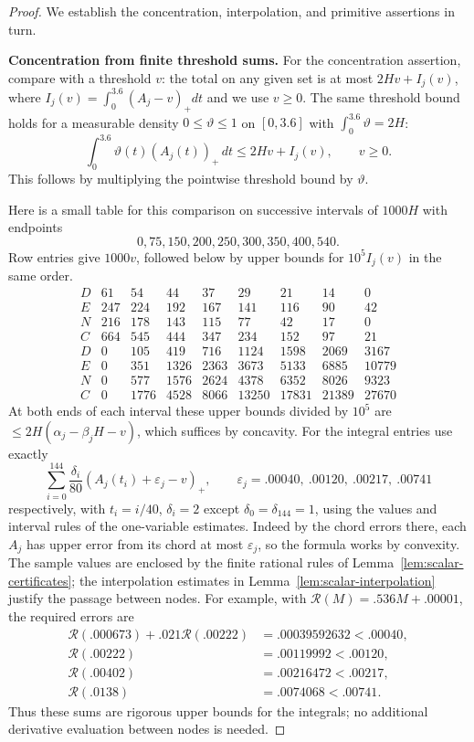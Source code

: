 \begin{proof}
We establish the concentration, interpolation, and primitive assertions in turn.

\smallskip
\noindent\textbf{Concentration from finite threshold sums.}\quad
For the concentration assertion, compare with a threshold \(v\): the total on any given set is at most \(2Hv+I_j(v)\), where \(I_j(v)=\int_0^{3.6}(A_j-v)_+ dt\) and we use \(v\ge0\). The same threshold bound holds for a measurable
density $0\le\vartheta\le1$ on $[0,3.6]$ with $\int_0^{3.6}\vartheta=2H$:
\[
 \int_0^{3.6}\vartheta(t)(A_j(t))_+\,dt
 \le 2Hv+I_j(v),\qquad v\ge0.
\]
This follows by multiplying the pointwise threshold bound by $\vartheta$.

Here is a small table for this comparison on successive intervals of \(1000H\) with endpoints
\[
 0,75,150,200,250,300,350,400,540.
\]
Row entries give \(1000v\), followed below by upper bounds for \(10^5 I_j(v)\) in the same order.
\[
\begin{array}{c|rrrrrrrr}
 D&61&54&44&37&29&21&14&0\\
 E&247&224&192&167&141&116&90&42\\
 N&216&178&143&115&77&42&17&0\\
 C&664&545&444&347&234&152&97&21\\\hline
 D&0&105&419&716&1124&1598&2069&3167\\
 E&0&351&1326&2363&3673&5133&6885&10779\\
 N&0&577&1576&2624&4378&6352&8026&9323\\
 C&0&1776&4528&8066&13250&17831&21389&27670
\end{array}
\]
At both ends of each interval these upper bounds divided by \(10^5\) are \(\le 2H(\alpha_j-\beta_j H-v)\), which suffices by concavity. For the integral entries use exactly
\[
 \sum_{i=0}^{144}\frac{\delta_i}{80}(A_j(t_i)+\varepsilon_j-v)_+,\qquad
 \varepsilon_j=.00040,\ .00120,\ .00217,\ .00741
\]
respectively, with \(t_i=i/40\), \(\delta_i=2\) except \(\delta_0=\delta_{144}=1\), using the values and interval rules of the one-variable estimates. Indeed by the chord errors there, each \(A_j\) has upper error from its chord at most \(\varepsilon_j\), so the formula works by convexity. The sample values are enclosed by the finite rational rules of
Lemma~\ref{lem:scalar-certificates}; the interpolation estimates in
Lemma~\ref{lem:scalar-interpolation} justify the passage between nodes.
For example, with $\mathcal R(M)=.536M+.00001$, the required errors are
\[
\begin{aligned}
 \mathcal R(.000673)+.021\mathcal R(.00222)&=.00039592632<.00040,\\
 \mathcal R(.00222)&=.00119992<.00120,\\
 \mathcal R(.00402)&=.00216472<.00217,\\
 \mathcal R(.0138)&=.0074068<.00741.
\end{aligned}
\]
Thus these sums are rigorous upper bounds for the integrals; no
additional derivative evaluation between nodes is needed.


\end{proof}
